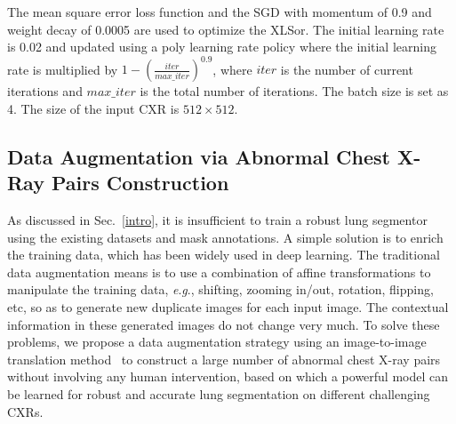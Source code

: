 \documentclass{midl} \usepackage{multirow}
\newcommand{\eg}{\textit{e}.\textit{g}., }
\begin{document}
The mean square error loss function and the SGD with momentum of 0.9 and weight decay of 0.0005 are used to optimize the XLSor. The initial learning rate is 0.02 and updated using a poly learning rate policy where the initial learning rate is multiplied by $1-(\frac{iter}{max\_iter})^{0.9}$, where $iter$ is the number of current iterations and $max\_iter$ is the total number of iterations. The batch size is set as 4. The size of the input CXR is $512\times512$.



\subsection{Data Augmentation via Abnormal Chest X-Ray Pairs Construction}
\label{munit}
As discussed in Sec.~\ref{intro}, it is insufficient to train a robust lung segmentor using the existing datasets and mask annotations.  A simple solution is to enrich the training data, which has been widely used in deep learning. The traditional data augmentation means is to use a combination of affine transformations to manipulate the training data, \eg shifting, zooming in/out, rotation, flipping, etc, so as to generate new duplicate images for each input image. The contextual information in these generated images do not change very much. To solve these problems, we propose a data augmentation strategy using an image-to-image translation method~\cite{munit} to construct a large number of abnormal chest X-ray pairs without involving any human intervention, based on which a powerful model can be learned for robust and accurate lung segmentation on different challenging CXRs.
\end{document}

